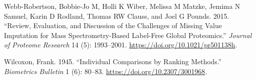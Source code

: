 \documentclass[
]{article}
\newlength{\cslhangindent}
\newenvironment{CSLReferences}[2] %
 {\begin{list}{}{%
  \setlength{\itemindent}{0pt}
  \setlength{\leftmargin}{0pt}
  \setlength{\parsep}{0pt}
  \ifodd #1
   \setlength{\leftmargin}{\cslhangindent}
   \setlength{\itemindent}{-1\cslhangindent}
  \fi
  \setlength{\itemsep}{#2\baselineskip}}}
 {\end{list}}
\begin{document}
\begin{CSLReferences}{1}{0}
Webb-Robertson, Bobbie-Jo M, Holli K Wiber, Melissa M Matzke, Jemima N
Samuel, Karin D Rodland, Thomas RW Clauss, and Joel G Pounds. 2015.
{``Review, Evaluation, and Discussion of the Challenges of Missing Value
Imputation for Mass Spectrometry-Based Label-Free Global Proteomics.''}
\emph{Journal of Proteome Research} 14 (5): 1993--2001.
\url{https://doi.org/10.1021/pr501138h}.

Wilcoxon, Frank. 1945. {``Individual Comparisons by Ranking Methods.''}
\emph{Biometrics Bulletin} 1 (6): 80--83.
\url{https://doi.org/10.2307/3001968}.

\end{CSLReferences}
\end{document}
